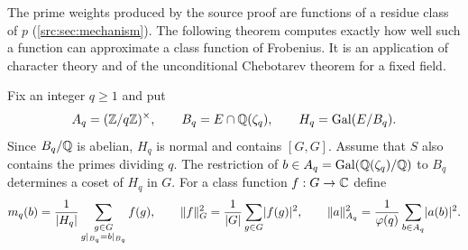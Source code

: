 The prime weights produced by the source proof are functions of a residue class of $p$
(\cref{src:sec:mechanism}). The following theorem computes exactly how well such a
function can approximate a class function of Frobenius. It is an application of character
theory and of the unconditional Chebotarev theorem for a fixed field.

Fix an integer $q\ge1$ and put
\[
 A_q=(\mathbb{Z}/q\mathbb{Z})^\times,\qquad B_q=E\cap\mathbb{Q}(\zeta_q),\qquad H_q=\operatorname{Gal}(E/B_q).
\]
Since $B_q/\mathbb{Q}$ is abelian, $H_q$ is normal and contains $[G,G]$. Assume that $S$ also
contains the primes dividing $q$. The restriction of $b\in A_q=\operatorname{Gal}(\mathbb{Q}(\zeta_q)/\mathbb{Q})$ to
$B_q$ determines a coset of $H_q$ in $G$. For a class function $f:G\to\mathbb{C}$ define
\begin{equation}\label{nab:eq:periodic-best}
 m_q(b)=\frac1{\lvert H_q\rvert}\sum_{\substack{g\in G\\g|_{B_q}=b|_{B_q}}}f(g),\qquad
 \lVert f\rVert_G^2=\frac1{\lvert G\rvert}\sum_{g\in G}\lvert f(g)\rvert^2,\qquad
 \lVert a\rVert_{A_q}^2=\frac1{\varphi(q)}\sum_{b\in A_q}\lvert a(b)\rvert^2 .
\end{equation}

